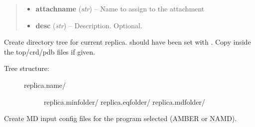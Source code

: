 \documentclass[letterpaper,10pt,english]{sphinxmanual}
\begin{document}
\begin{fulllineitems}
\begin{fulllineitems}
\begin{quote}
\begin{description}
\begin{itemize}
\item {} 
\textbf{attachname} (\emph{str}) -- Name to assign to the attachment

\item {} 
\textbf{desc} (\emph{str}) -- Description. Optional.

\end{itemize}

\end{description}\end{quote}

\end{fulllineitems}


\begin{fulllineitems}
\label{replicas:pyMDMix.Replicas.Replica.createFolders}
Create directory tree for current replica.  should have been set
with {\hyperref[replicas:pyMDMix.Replicas.Replica.setPath]{}}. Copy inside the top/crd/pdb files if given.
\begin{description}
\item[{Tree structure:}] \leavevmode\begin{description}
\item[{replica.name/}] \leavevmode
replica.minfolder/
replica.eqfolder/
replica.mdfolder/

\end{description}

\end{description}

\end{fulllineitems}


\begin{fulllineitems}
\label{replicas:pyMDMix.Replicas.Replica.createMDInput}
Create MD input config files for the program selected (AMBER or NAMD).

\end{fulllineitems}



\end{fulllineitems}
\end{document}
